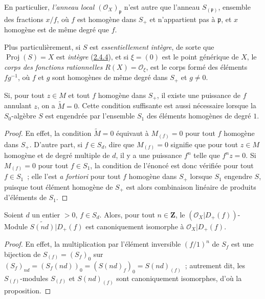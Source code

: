 En particulier, \emph{l'anneau local $(\mathcal{O}_X)_\mathfrak{p}$} n'est
autre que l'anneau $S_{(\mathfrak{p})}$, ensemble des fractions $x/f$, où
$f$ est homogène dans $S_+$ et n'appartient pas à $\mathfrak{p}$, et $x$
homogène est de même degré que $f$.

Plus particulièrement, si $S$ est \emph{essentiellement intègre}, de sorte
que $\operatorname{Proj}(S)=X$ est \emph{intègre}
(\hyperref[II.2.4.4-fr]{2.4.4}), et si $\xi=(0)$ est le point générique de
$X$, le \emph{corps des fonctions rationnelles}
$R(X)=\mathcal{O}_\xi$, est le corps formé des éléments $fg^{-1}$, où $f$
et $g$ sont homogènes de même degré dans $S_+$ et $g\neq0$.

\begin{proposition}[2.5.6]
\label{II.2.5.6-fr}
Si, pour tout $z\in M$ et tout $f$ homogène dans $S_+$, il existe une
puissance de $f$ annulant $z$, on a $\widetilde{M}=0$. Cette condition
suffisante est aussi nécessaire lorsque la $S_0$-algèbre $S$ est engendrée
par l'ensemble $S_1$ des éléments homogènes de degré $1$.
\end{proposition}

\begin{proof}
En effet, la condition $\widetilde{M}=0$ équivaut à $M_{(f)}=0$ pour tout
$f$ homogène dans $S_+$. D'autre part, si $f\in S_d$, dire que $M_{(f)}=0$
signifie que pour tout $z\in M$ homogène et de degré multiple de $d$, il y
a une puissance $f^n$ telle que $f^nz=0$. Si $M_{(f)}=0$ pour tout
$f\in S_1$, la condition de l'énoncé est donc vérifiée pour tout
$f\in S_1$~; elle l'est \emph{a fortiori} pour tout $f$ homogène dans
$S_+$ lorsque $S_1$ engendre $S$, puisque tout élément homogène de $S_+$
est alors combinaison linéaire de produits d'éléments de $S_1$.
\end{proof}

\begin{proposition}[2.5.7]
\label{II.2.5.7-fr}
Soient $d$ un entier $>0$, $f\in S_d$. Alors, pour tout $n\in\mathbf{Z}$,
le $(\mathcal{O}_X|D_+(f))$-Module
$\widetilde{S(nd)}|D_+(f)$ est canoniquement isomorphe à
$\mathcal{O}_X|D_+(f)$.
\end{proposition}

\begin{proof}
En effet, la multiplication par l'élément inversible $(f/1)^n$ de $S_f$
est une bijection de $S_{(f)}=(S_f)_0$ sur
$(S_f)_{nd}=(S_f(nd))_0=(S(nd)_f)_0=S(nd)_{(f)}$~; autrement dit, les
$S_{(f)}$-modules $S_{(f)}$ et $S(nd)_{(f)}$ sont canoniquement
isomorphes, d'où la proposition.
\end{proof}

